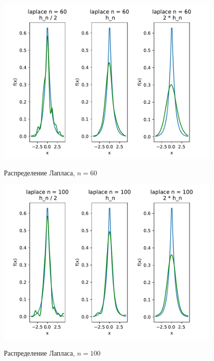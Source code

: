 \documentclass[a4paper]{article}
\begin{document}
\begin{figure}[H]
	\centering
	{\includegraphics[scale=0.5]{src_lab_4/kde_60_laplace}}
		\caption{Распределение Лапласа, $n=60$}
		\label{fig:kde_laplace_60}
	\end{figure}

\begin{figure}[H]
	\centering
	{\includegraphics[scale=0.5]{src_lab_4/kde_100_laplace}}
		\caption{Распределение Лапласа, $n=100$}
		\label{fig:kde_laplace_100}
	\end{figure}
\end{document}
